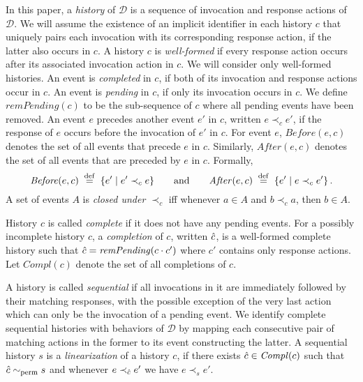 \documentclass{LMCS}
\newcommand{\defeq}{\;\stackrel{\rm def}{=}\;}
\newcommand{\remPending}[1]{\ensuremath{\mathit{remPending}({#1})}}
\newcommand{\Compl}[1]{\ensuremath{\mathit{Compl}({#1})}}
\newcommand{\Before}[2]{\ensuremath{\mathit{Before}({#1},{#2})}}
\newcommand{\After}[2]{\ensuremath{\mathit{After}({#1},{#2})}}
\newcommand{\compl}{\ensuremath{\hat}}
\newcommand{\permeq}{\sim_{\rm perm}}
\begin{document}
In this paper, a {\em history} of $\mathcal{D}$ is a sequence of invocation and response actions of $\mathcal{D}$. 
We will assume the existence of an implicit identifier in each history $c$ that uniquely pairs each invocation with its corresponding response action, if the latter also occurs in $c$.
A history $c$ is {\em well-formed} if every response action occurs after its associated invocation action in $c$.
We will consider only well-formed histories.
An event is {\em completed} in $c$, if both of its invocation and response actions occur in $c$.
An event is {\em pending} in $c$, if only its invocation occurs in $c$.
We define $\remPending c$ to be the sub-sequence of $c$ where all pending events have been removed.
An event $e$ precedes another event $e'$ in $c$, written $e\prec_ce'$, if the response of $e$ occurs before the invocation of $e'$ in $c$.
For event $e$, $\Before e c$ denotes the set of all events that precede $e$ in $c$. 
Similarly, $\After e c$ denotes the set of all events that are preceded by $e$ in $c$.
Formally, 
\[\Before e c \defeq \{e' \mid e'\prec_c e\} \qquad\text{and}\qquad
  \After e c  \defeq \{e' \mid e \prec_c e'\} \,. \]
A set of events $A$ is {\em closed under $\prec_c$} iff whenever $a\in A$ and $b\prec_c a$, then $b\in A$.

History $c$ is called {\em complete} if it does not have any pending events.
For a possibly incomplete history $c$, a {\em completion} of $c$, written $\compl{c}$, is a well-formed complete history such that $\compl{c}=\remPending{c\cdot c'}$ where $c'$ contains only response actions.
Let $\Compl c$ denote the set of all completions of $c$.

A history is called {\em sequential} if all invocations in it are immediately followed by their matching responses, with the possible exception of the very last action which can only be the invocation of a pending event.
We identify complete sequential histories with behaviors of $\mathcal{D}$ by mapping each consecutive pair of matching actions in the former to its event constructing the latter.
A sequential history $s$ is a {\em linearization} of a history $c$, if there exists $\compl{c}\in\Compl c$ such that $\compl{c}\permeq s$ and whenever $e\prec_{\compl{c}}e'$ we have $e\prec_se'$.
\end{document}
